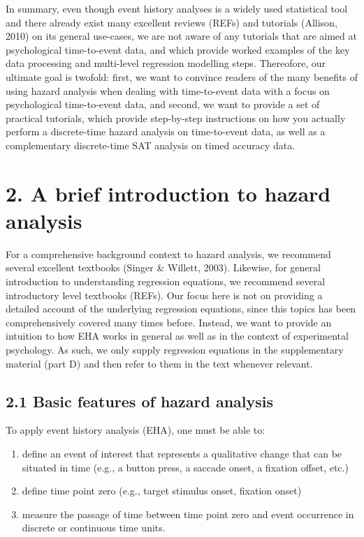 \documentclass[
  man,floatsintext]{apa6}
\begin{document}
In summary, even though event history analyses is a widely used statistical tool and there already exist many excellent reviews (REFs) and tutorials (Allison, 2010) on its general use-cases, we are not aware of any tutorials that are aimed at psychological time-to-event data, and which provide worked examples of the key data processing and multi-level regression modelling steps.
Thereofore, our ultimate goal is twofold: first, we want to convince readers of the many benefits of using hazard analysis when dealing with time-to-event data with a focus on psychological time-to-event data, and second, we want to provide a set of practical tutorials, which provide step-by-step instructions on how you actually perform a discrete-time hazard analysis on time-to-event data, as well as a complementary discrete-time SAT analysis on timed accuracy data.

\section{2. A brief introduction to hazard analysis}\label{a-brief-introduction-to-hazard-analysis}

For a comprehensive background context to hazard analysis, we recommend several excellent textbooks (Singer \& Willett, 2003). Likewise, for general introduction to understanding regression equations, we recommend several introductory level textbooks (REFs). Our focus here is not on providing a detailed account of the underlying regression equations, since this topics has been comprehensively covered many times before. Instead, we want to provide an intuition to how EHA works in general as well as in the context of experimental psychology. As such, we only supply regression equations in the supplementary material (part D) and then refer to them in the text whenever relevant.

\subsection{2.1 Basic features of hazard analysis}\label{basic-features-of-hazard-analysis}

To apply event history analysis (EHA), one must be able to:

\begin{enumerate}
\def\labelenumi{\arabic{enumi}.}
\item
  define an event of interest that represents a qualitative change that can be situated in time (e.g., a button press, a saccade onset, a fixation offset, etc.)
\item
  define time point zero (e.g., target stimulus onset, fixation onset)
\item
  measure the passage of time between time point zero and event occurrence in discrete or continuous time units.
\end{enumerate}
\end{document}
